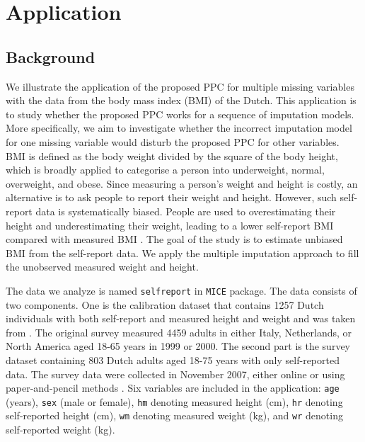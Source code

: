 	\section{Application}
	\label{sec:6.6}
	\subsection{Background}
	We illustrate the application of the proposed PPC for multiple missing variables with the data from the body mass index (BMI) of the Dutch. This application is to study whether the proposed PPC works for a sequence of imputation models. More specifically, we aim to investigate whether the incorrect imputation model for one missing variable would disturb the proposed PPC for other variables. BMI is defined as the body weight divided by the square of the body height, which is broadly applied to categorise a person into underweight, normal, overweight, and obese. Since measuring a person's weight and height is costly, an alternative is to ask people to report their weight and height. However, such self-report data is systematically biased. People are used to overestimating their height and underestimating their weight, leading to a lower self-report BMI compared with measured BMI \citep[Section 9.3]{Buuren2018}. The goal of the study is to estimate unbiased BMI from the self-report data. We apply the multiple imputation approach to fill the unobserved measured weight and height. 
	
	The data we analyze is named \texttt{selfreport} in \texttt{MICE} package. The data consists of two components. One is the calibration dataset that contains 1257 Dutch individuals with both self-report and measured height and weight and was taken from \citet{krul2011self}. The original survey measured 4459 adults in either Italy, Netherlands, or North America aged 18-65 years in 1999 or 2000. The second part is the survey dataset containing 803 Dutch adults aged 18-75 years with only self-reported data. The survey data were collected in November 2007, either online or using paper-and-pencil methods \citep[Section 9.3]{Buuren2018}. Six variables are included in the application: \texttt{age} (years), \texttt{sex} (male or female), \texttt{hm} denoting measured height (cm), \texttt{hr} denoting self-reported height (cm), \texttt{wm} denoting measured weight (kg), and \texttt{wr} denoting self-reported weight (kg). 
	
